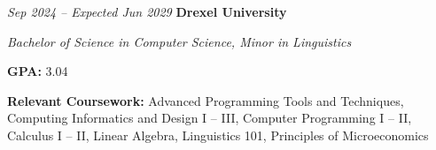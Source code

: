 \begin{twocolentry}{
        \textit{Sep 2024 – Expected Jun 2029}}
    \textbf{Drexel University}

    \textit{Bachelor of Science in Computer Science, Minor in Linguistics}
\end{twocolentry}

\vspace{0.10 cm}

\begin{onecolentry}
    \begin{highlights}
        \item \textbf{GPA:} 3.04
        \item \textbf{Relevant Coursework:} Advanced Programming Tools and Techniques, Computing Informatics and Design I -- III, Computer Programming I -- II, Calculus I -- II, Linear Algebra, Linguistics 101, Principles of Microeconomics
    \end{highlights}
\end{onecolentry}
